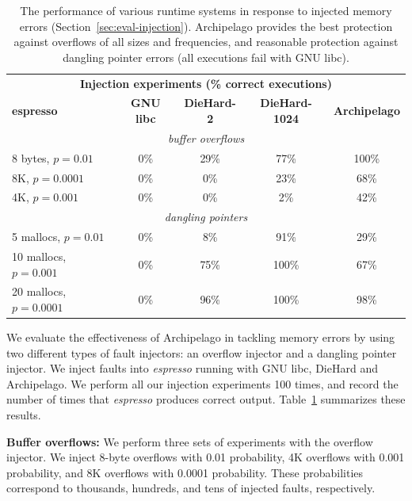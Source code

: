 \documentclass{acm_proc_article-sp}
\begin{document}
\begin{table}[!t]
\centering
\begin{tabular}{|lcccc|}
\hline
\multicolumn{5}{|c|}{\bf \small Injection experiments (\% correct executions)} \\
{\bf \small espresso} & {\bf \small GNU libc} & {\bf \small DieHard-2}
& {\bf \small DieHard-1024} & {\bf \small Archipelago} \\ \hline
\multicolumn{5}{|c|}{\em buffer overflows} \\
8 bytes, $p=0.01$ & 0\%                 & 29\%            & 77\%               & 100\% \\
8K, $p=0.0001$ & 0\%                 & 0\%             & 23\%               & 68\%  \\
4K, $p=0.001$  & 0\%                 & 0\%             & 2\%                & 42\%  \\
\multicolumn{5}{|c|}{\em dangling pointers} \\
5 mallocs, $p=0.01$     & 0\%                 & 8\%             & 91\%               & 29\%  \\
10 mallocs, $p=0.001$   & 0\%                 & 75\%            & 100\%              & 67\%  \\
20 mallocs, $p=0.0001$  & 0\%                 & 96\%            & 100\%              & 98\%  \\ \hline
\end{tabular}
\caption{The performance of various runtime systems in response to injected memory errors (Section~\ref{sec:eval-injection}). Archipelago provides the best protection against overflows of all sizes and frequencies, and reasonable protection against dangling pointer errors (all executions fail with GNU libc).\label{tbl:injection-errors}}
\end{table}


\noindent
We evaluate the effectiveness of Archipelago in tackling memory errors
by using two different types of fault injectors: an overflow injector
and a dangling pointer injector. We inject faults into \emph{espresso}
running with GNU libc, DieHard and Archipelago. We perform all our
injection experiments 100 times, and record the number of times that
\emph{espresso} produces correct
output. Table~\ref{tbl:injection-errors} summarizes these results.


{\bf Buffer overflows:} We perform three sets of experiments with the overflow injector. We
inject 8-byte overflows with 0.01 probability, 4K overflows with 0.001
probability, and 8K overflows with 0.0001 probability. These
probabilities correspond to thousands, hundreds, and tens of injected
faults, respectively.
\end{document}
